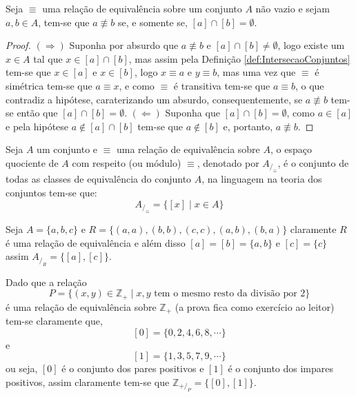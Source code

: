 \begin{teorema}\label{teo:EquivalenciaPropriedade2}
	Seja $\equiv$ uma relação de equivalência sobre um conjunto $A$ não vazio e sejam $a, b \in A$, tem-se que $a \not\equiv b$ se, e somente se, $[a] \cap [b] = \emptyset$.
\end{teorema}

\begin{proof}
	$(\Rightarrow)$ Suponha por absurdo que $a \not\equiv b$ e $[a] \cap [b] \neq \emptyset$, logo existe um $x \in A$ tal que $x \in [a] \cap [b]$, mas assim pela Definição \ref{def:IntersecaoConjuntos} tem-se que $x \in [a]$ e $x \in [b]$, logo $x \equiv a$ e $y \equiv b$, mas uma vez que $\equiv$ é simétrica tem-se que $a \equiv x$, e como $\equiv$ é transitiva tem-se que $a \equiv b$, o que contradiz a hipótese, caraterizando um absurdo, consequentemente, se $a \not\equiv b$ tem-se então que $[a] \cap [b] = \emptyset$. $(\Leftarrow)$ Suponha que $[a] \cap [b] = \emptyset$, como $a \in [a]$ e pela hipótese $a \notin [a] \cap [b]$ tem-se que $a \notin [b]$ e, portanto, $a \not\equiv b$.
\end{proof}

\begin{definicao}\label{def:EspacoQuociente}
	Seja $A$ um conjunto e $\equiv$ uma relação de equivalência sobre $A$, o espaço quociente de $A$ com respeito (ou módulo) $\equiv$, denotado por $A_{/_\equiv}$, é o conjunto de todas as classes de equivalência do conjunto $A$, na linguagem na teoria dos conjuntos tem-se que:
	$$A_{/_\equiv} = \{[x] \mid x \in A\}$$
\end{definicao}

\begin{exemplo}
	Seja $A = \{a, b, c\}$ e $R = \{(a, a), (b, b), (c, c), (a, b), (b, a)\}$ claramente $R$ é uma relação de equivalência e além disso $[a] = [b] = \{a, b\}$ e $[c] = \{c\}$ assim $A_{/_R} = \{[a], [c]\}$.
\end{exemplo}

\begin{exemplo}
	Dado que a relação 
  $$P = \{(x,y) \in \mathbb{Z}_+ \mid x, y\text{ tem o mesmo resto da divisão por } 2\}$$ 
  é uma relação de equivalência sobre $\mathbb{Z}_+$ (a prova fica como exercício ao leitor) tem-se claramente que, 
	$$[0] = \{0, 2, 4, 6, 8, \cdots\}$$
	e
	$$[1] = \{1, 3, 5, 7, 9, \cdots\}$$
	ou seja, $[0]$ é o conjunto dos pares positivos e $[1]$ é o conjunto dos impares positivos, assim claramente tem-se que $\mathbb{Z}_{+/_P} = \{[0], [1]\}$.
\end{exemplo}

